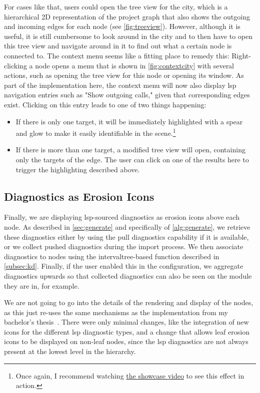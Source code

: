 \documentclass[../thesis]{subfiles}
\begin{document}
For cases like that, users could open the tree view for the city, which is a hierarchical 2D representation of the project graph that also shows the outgoing and incoming edges for each node (see \cref{fig:treeview}).
However, although it is useful, it is still cumbersome to look around in the city and to then have to open this tree view and navigate around in it to find out what a certain node is connected to.
The context menu seems like a fitting place to remedy this:
Right-clicking a node opens a menu that is shown in \cref{fig:contextcity} with several actions, such as opening the tree view for this node or opening its \gls{window}.
As part of the implementation here, the context menu will now also display \gls{lsp} navigation entries such as "Show outgoing calls," given that corresponding edges exist.
Clicking on this entry leads to one of two things happening:
\begin{itemize}
	\item If there is only one target, it will be immediately highlighted with a spear and glow to make it easily identifiable in the scene.\footnote{
		      Once again, I recommend watching \href{https://www.youtube.com/watch?v=yAzyv2_q2ng}{the showcase video} to see this effect in action.
	      }
	\item If there is more than one target, a modified tree view will open, containing only the targets of the edge.
	      The user can click on one of the results here to trigger the highlighting described above.
\end{itemize}

\subsection{Diagnostics as Erosion Icons}
Finally, we are displaying \gls{lsp}-sourced diagnostics as erosion icons above each node.
As described in \cref{sec:generate} and specifically  of \cref{alg:generate}, we retrieve these diagnostics either by using the pull diagnostics \gls{capability} if it is available, or we collect pushed diagnostics during the import process.
We then associate diagnostics to nodes using the \gls{intervaltree}-based function described in \cref{subsec:kd}.
Finally, if the user enabled this in the configuration, we aggregate diagnostics upwards so that collected diagnostics can also be seen on the module they are in, for example.

We are not going to go into the details of the rendering and display of the nodes, as this just re-uses the same mechanisms as the implementation from my bachelor's thesis~\cite[section~3.3]{galperin2021}.
There were only minimal changes, like the integration of new icons for the different \gls{lsp} diagnostic types, and a change that allows leaf erosion icons to be displayed on non-leaf nodes, since the \gls{lsp} diagnostics are not always present at the lowest level in the hierarchy.
\end{document}
